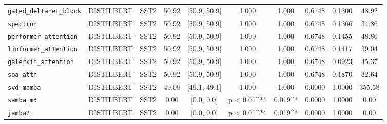 \begin{table}[t]
\begin{tabular}{l l l c c c c c c c}
\texttt{gated\_deltanet\_block} & DISTILBERT & SST2 & 50.92 & [50.9, 50.9] & 1.000 & 1.000 & 0.6748 & 0.1300 & 48.92 \\
\texttt{spectron} & DISTILBERT & SST2 & 50.92 & [50.9, 50.9] & 1.000 & 1.000 & 0.6748 & 0.1366 & 34.86 \\
\texttt{performer\_attention} & DISTILBERT & SST2 & 50.92 & [50.9, 50.9] & 1.000 & 1.000 & 0.6748 & 0.1455 & 48.80 \\
\texttt{linformer\_attention} & DISTILBERT & SST2 & 50.92 & [50.9, 50.9] & 1.000 & 1.000 & 0.6748 & 0.1417 & 39.04 \\
\texttt{galerkin\_attention} & DISTILBERT & SST2 & 50.92 & [50.9, 50.9] & 1.000 & 1.000 & 0.6748 & 0.0923 & 45.37 \\
\texttt{soa\_attn} & DISTILBERT & SST2 & 50.92 & [50.9, 50.9] & 1.000 & 1.000 & 0.6748 & 0.1870 & 32.64 \\
\texttt{svd\_mamba} & DISTILBERT & SST2 & 49.08 & [49.1, 49.1] & 1.000 & 1.000 & 0.0000 & 1.0000 & 355.58 \\
\texttt{samba\_m3} & DISTILBERT & SST2 & 0.00 & [0.0, 0.0] & p < 0.01^{**} & 0.019^* & 0.0000 & 1.0000 & 0.00 \\
\texttt{jamba2} & DISTILBERT & SST2 & 0.00 & [0.0, 0.0] & p < 0.01^{**} & 0.019^* & 0.0000 & 1.0000 & 0.00 \\
\bottomrule
\end{tabular}
\end{table}